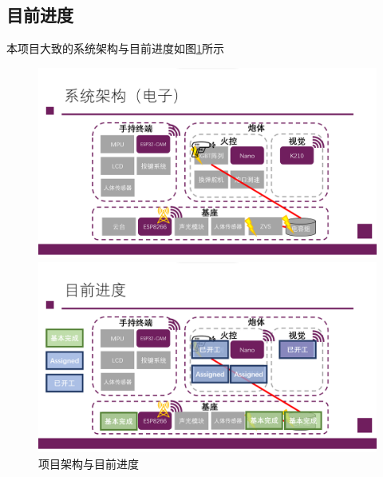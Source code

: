 \documentclass{article}
\begin{document}
\subsection{目前进度}
本项目大致的系统架构与目前进度如图\ref{prog}所示
\begin{figure}
\centering
\begin{minipage}[b]{0.45\linewidth}
    \centering
    \includegraphics[width=\linewidth]{imgs/systemStructure.png}
\end{minipage}
\begin{minipage}[b]{0.45\linewidth}
    \centering
    \includegraphics[width=\linewidth]{imgs/progress.png}
\end{minipage}
\caption{项目架构与目前进度}
\label{prog}
\end{figure}
\end{document}
